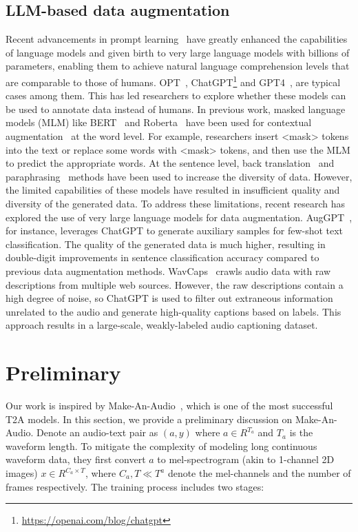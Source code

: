 \documentclass{article}
\begin{document}
\subsection{LLM-based data augmentation}
Recent advancements in prompt learning~\cite{liu2021pretrain} have greatly enhanced the capabilities of language models and given birth to very large language models with billions of parameters, enabling them to achieve natural language comprehension levels that are comparable to those of humans. OPT~\cite{zhang2022opt}, ChatGPT\footnote[1]{\url{https://openai.com/blog/chatgpt}} and GPT4~\cite{openai2023gpt4}, are typical cases among them. This has led researchers to explore whether these models can be used to annotate data instead of humans. In previous work, masked language models (MLM) like BERT~\cite{devlin2018bert} and Roberta~\cite{liu2019roberta} have been used for contextual augmentation~\cite{kumar2021data} at the word level. For example, researchers insert <mask> tokens into the text or replace some words with <mask> tokens, and then use the MLM to predict the appropriate words. At the sentence level, back translation~\cite{sennrich2015improving} and paraphrasing~\cite{kumar2019submodular} methods have been used to increase the diversity of data. However, the limited capabilities of these models have resulted in insufficient quality and diversity of the generated data.
To address these limitations, recent research has explored the use of very large language models for data augmentation. AugGPT~\cite{dai2023auggpt}, for instance, leverages ChatGPT to generate auxiliary samples for few-shot text classification. The quality of the generated data is much higher, resulting in double-digit improvements in sentence classification accuracy compared to previous data augmentation methods. WavCaps~\cite{mei2023wavcaps} crawls audio data with raw descriptions from multiple web sources. However, the raw descriptions contain a high degree of noise, so ChatGPT is used to filter out extraneous information unrelated to the audio and generate high-quality captions based on labels. This approach results in a large-scale, weakly-labeled audio captioning dataset.

 \section{Preliminary}
Our work is inspired by Make-An-Audio~\cite{huang2023makeanaudio}, which is one of the most successful T2A models. In this section, we provide a preliminary discussion on Make-An-Audio. Denote an audio-text pair as $(a,y)$ where $a \in R^{T_a}$ and $T_a$ is the waveform length. To mitigate the complexity of modeling long continuous waveform data, they first convert $a$ to mel-spectrogram (akin to 1-channel 2D images) $x \in R^{C_a \times T}$, where $C_a, T \ll T^a$ denote the mel-channels and the number of frames respectively. The training process includes two stages:
  
\end{document}
